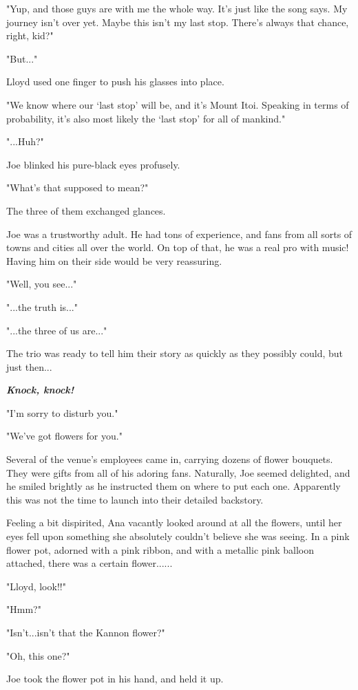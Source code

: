 \documentclass[
]{article}
\begin{document}
"Yup, and those guys are with me the whole way. It's just like the song
says. My journey isn't over yet. Maybe this isn't my last stop. There's
always that chance, right, kid?"

"But..."

Lloyd used one finger to push his glasses into place.

"We know where our `last stop' will be, and it's Mount Itoi. Speaking in
terms of probability, it's also most likely the `last stop' for all of
mankind."

"...Huh?"

Joe blinked his pure-black eyes profusely.

"What's that supposed to mean?"

The three of them exchanged glances.

Joe was a trustworthy adult. He had tons of experience, and fans from
all sorts of towns and cities all over the world. On top of that, he was
a real pro with music! Having him on their side would be very
reassuring.

"Well, you see..."

"...the truth is..."

"...the three of us are..."

The trio was ready to tell him their story as quickly as they possibly
could, but just then...

\emph{\textbf{Knock, knock!}}

"I'm sorry to disturb you."

"We've got flowers for you."

Several of the venue's employees came in, carrying dozens of flower
bouquets. They were gifts from all of his adoring fans. Naturally, Joe
seemed delighted, and he smiled brightly as he instructed them on where
to put each one. Apparently this was not the time to launch into their
detailed backstory.

Feeling a bit dispirited, Ana vacantly looked around at all the flowers,
until her eyes fell upon something she absolutely couldn't believe she
was seeing. In a pink flower pot, adorned with a pink ribbon, and with a
metallic pink balloon attached, there was a certain flower......

"Lloyd, look!!"

"Hmm?"

"Isn't...isn't that the Kannon flower?"

"Oh, this one?"

Joe took the flower pot in his hand, and held it up.
\end{document}
